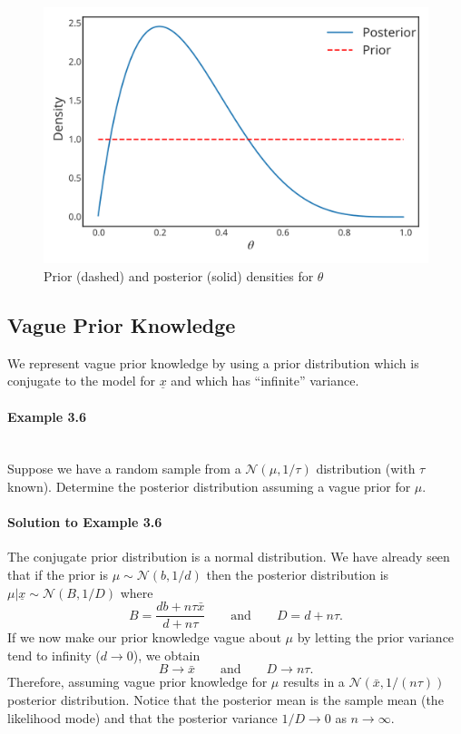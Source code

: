 \begin{figure}[ht]

\includegraphics{images/priorplot1.svg}
\caption{Prior (dashed) and posterior (solid) densities for $\theta$}
\label{fig:little}

\end{figure}

\newpage 
\subsection*{Vague Prior Knowledge}
We represent vague prior knowledge by using a prior distribution which is conjugate to the model for $\underline{x}$ and which has ``infinite'' variance.

\paragraph{Example 3.6}{~\\
Suppose we have a random sample from a $\mathcal{N}(\mu,1/\tau)$ distribution (with $\tau$ known). Determine the posterior distribution assuming a vague prior for $\mu$.

\paragraph{Solution to Example 3.6}{
    
        The conjugate prior distribution is a normal distribution. We have already seen that if the prior is $\mu\sim \mathcal{N}(b,1/d)$ then the posterior distribution is $\mu|\underline{x}\sim \mathcal{N}(B,1/D)$ where
            \begin{equation*}
                B=\frac{db+n\tau\bar x}{d+n\tau}\qquad\text{and}\qquad
                D=d+n\tau.
            \end{equation*}
        If we now make our prior knowledge vague about $\mu$ by letting the prior variance tend to infinity ($d\to 0$), we obtain
        $$
        B\to\bar x\qquad\text{and}\qquad D\to n\tau.
        $$
        Therefore, assuming vague prior knowledge for $\mu$ results in a $\mathcal{N}(\bar x,1/(n\tau))$ posterior distribution.  Notice that the posterior mean is the sample mean (the likelihood mode) and that the posterior variance $1/D\to 0$ as $n\to\infty$.
        
    
}}

